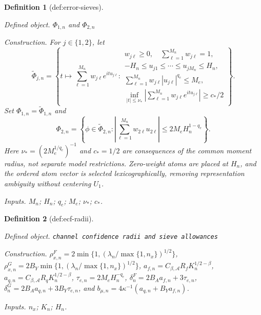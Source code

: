 \documentclass{article}
\newtheorem{definition}{Definition}
\begin{document}
\begin{definition}[def:error-sieves]\label{def:error-sieves}
\par\smallskip\noindent\emph{Defined object.} \(\Phi_{1,n}\) and \(\Phi_{2,n}\)
\par\smallskip\noindent\emph{Construction.} For \(j\in\{1,2\}\), let
\[
 \widetilde\Phi_{j,n}
 =\left\{
 t\longmapsto\sum_{\ell=1}^{M_n}w_{j\ell}e^{itu_{j\ell}}:
 \begin{array}{l}
 w_{j\ell}\ge0,\quad \sum_{\ell=1}^{M_n}w_{j\ell}=1,\\
 -H_n\le u_{j1}\le\cdots\le u_{jM_n}\le H_n,\\
 \sum_{\ell=1}^{M_n}w_{j\ell}|u_{j\ell}|^{q_e}\le M_e,\\
 \displaystyle
 \inf_{|t|\le\nu_*}
 \left|\sum_{\ell=1}^{M_n}w_{j\ell}e^{itu_{j\ell}}\right|
 \ge c_*/2
 \end{array}
 \right\}.
\]
Set \(\Phi_{1,n}=\widetilde\Phi_{1,n}\) and
\[
 \Phi_{2,n}
 =\left\{\phi\in\widetilde\Phi_{2,n}:
 \left|\sum_{\ell=1}^{M_n}w_{2\ell}u_{2\ell}\right|
 \le2M_eH_n^{1-q_e}\right\}.
\]
Here \(\nu_*=(2M_e^{1/q_e})^{-1}\) and \(c_*=1/2\) are consequences of
the common moment radius, not separate model restrictions.  Zero-weight
atoms are placed at \(H_n\), and the ordered atom vector is selected
lexicographically, removing representation ambiguity without centering
\(U_1\).
\par\smallskip\noindent\emph{Inputs.} \(M_n\); \(H_n\); \(q_e\); \(M_e\); \(\nu_*\); \(c_*\).
\end{definition}

\begin{definition}[def:ecf-radii]\label{def:ecf-radii}
\par\smallskip\noindent\emph{Defined object.} \texttt{channel confidence radii and sieve allowances}
\par\smallskip\noindent\emph{Construction.} \(\rho^F_{x,n}=2\min\{1,(\lambda_n/\max\{1,n_x\})^{1/2}\}\), \(\rho^G_{x,n}=2B_Y\min\{1,(\lambda_n/\max\{1,n_x\})^{1/2}\}\), \(a_{f,n}=C_{\beta,\mathcal A}R_fK_n^{1/2-\beta}\), \(a_{q,n}=C_{\beta,\mathcal A}R_qK_n^{1/2-\beta}\), \(\tau_{e,n}=2M_eH_n^{-q_e}\), \(\delta^F_n=2B_Aa_{f,n}+3\tau_{e,n}\), \(\delta^G_n=2B_Aa_{q,n}+3B_Y\tau_{e,n}\), and \(b_{\mu,n}=4\kappa^{-1}(a_{q,n}+B_Ya_{f,n})\).
\par\smallskip\noindent\emph{Inputs.} \(n_x\); \(K_n\); \(H_n\).
\end{definition}
\end{document}
